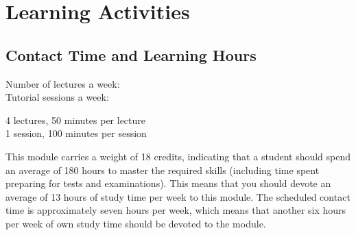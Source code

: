 \section{Learning Activities}
    \subsection{Contact Time and Learning Hours}
        \begin{minipage}{0.4\linewidth}
            Number of lectures a week: \\
            Tutorial sessions a week:
        \end{minipage}
        \begin{minipage}{0.4\linewidth}
            4 lectures, 50 minutes per lecture \\
            1 session, 100 minutes per session
        \end{minipage}

        This module carries a weight of 18 credits, indicating that a
        student should spend an average of 180 hours to master the
        required skills (including time spent preparing for tests and
        examinations). This means that you should devote an average of
        13 hours of study time per week to this module. The scheduled
        contact time is approximately seven hours per week, which
        means that another six hours per week of own study time
        should be devoted to the module.

